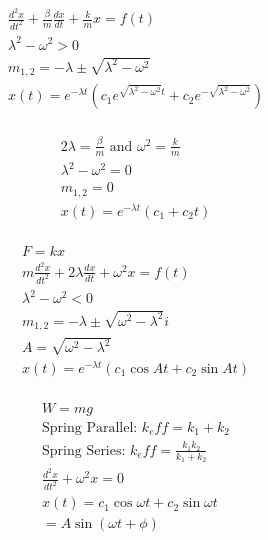 \documentclass[12pt]{article}
\begin{document}
\begin{multicols}{2}

  \begin{equation*}
    \begin{split}
      \frac{d^2x}{dt^2}+\frac{\beta}{m}\frac{dx}{dt}+\frac{k}{m}x=f(t)\\
      \lambda^2-\omega^2>0\\
      m_{1,2}=-\lambda \pm\sqrt{\lambda^2-\omega^2}\\
      x(t)=e^{-\lambda t}\left(c_1e^{\sqrt{\lambda^2-\omega^2}t}+c_2e^{-\sqrt{\lambda^2-\omega^2}} \right)\\
    \end{split}
    \label{5}
  \end{equation*}

  \begin{equation*}
    \begin{split}
      2\lambda=\frac{\beta}{m}\text{ and } \omega^2=\frac{k}{m}\\ 
     \lambda^2-\omega^2=0\\
      m_{1,2}=0\\
      x(t)=e^{-\lambda t}(c_1+c_2t)\\
    \end{split}
    \label{6}
  \end{equation*}

\end{multicols}
  \vspace{-20pt}

\begin{multicols}{2}

  \begin{equation*}
    \begin{split}
      F=kx\\
      m\frac{d^2x}{dt^2}+2\lambda\frac{dx}{dt}+\omega^2x=f(t)\\
      \lambda^2-\omega^2<0\\
      m_{1,2}=-\lambda \pm\sqrt{\omega^2-\lambda^2}i\\
      A=\sqrt{\omega^2-\lambda^2}\\
      x(t)=e^{-\lambda t}\left(c_1\cos At+c_2\sin At\right)\\
    \end{split}
    \label{7}
  \end{equation*}

  \begin{equation*}
    \begin{split}
      W=mg\\
      \text{Spring Parallel: } k_eff=k_1+k_2\\
      \text{Spring Series: } k_eff=\frac{k_1k_2}{k_1+k_2}\\
    \frac{d^2x}{dt^2}+\omega^2x=0\\
    x(t)=c_1\cos\omega t+ c_2\sin\omega t\\
    =A\sin(\omega t+\phi)
    \end{split}
    \label{8}
  \end{equation*}


\end{multicols}
  \vspace{-20pt}
\end{document}
